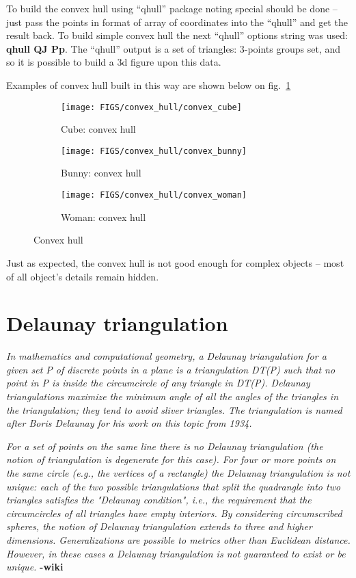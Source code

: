 \documentclass[11pt]{article}
\begin{document}
To build the convex hull using “qhull” package noting special should be done – just pass the points in format of array of coordinates into the “qhull” and get the result back. To build simple convex hull the next “qhull” options string was used: \textbf{qhull QJ Pp}. The “qhull” output is a set of triangles: 3-points groups set, and so it is possible to build a 3d figure upon this data.

Examples of convex hull built in this way are shown below on fig.~\ref{fig:convex}
\begin{figure}[h]
    \begin{subfigure}{.3\textwidth}
        \centering
        \texttt{[image: FIGS/convex\_hull/convex\_cube]}
        \caption{Cube: convex hull}
    \end{subfigure}
    \begin{subfigure}{.3\textwidth}
        \centering
        \texttt{[image: FIGS/convex\_hull/convex\_bunny]}
        \caption{Bunny: convex hull}
    \end{subfigure}
    \begin{subfigure}{.3\textwidth}
        \centering
        \texttt{[image: FIGS/convex\_hull/convex\_woman]}
        \caption{Woman: convex hull}
    \end{subfigure}
    \caption{Convex hull}
    \label{fig:convex}
\end{figure}

Just as expected, the convex hull is not good enough for complex objects – most of all object's details remain hidden.

\section{Delaunay triangulation}
\textit{In mathematics and computational geometry, a Delaunay triangulation for a given set P of discrete points in a plane is a triangulation DT(P) such that no point in P is inside the circumcircle of any triangle in DT(P). Delaunay triangulations maximize the minimum angle of all the angles of the triangles in the triangulation; they tend to avoid sliver triangles. The triangulation is named after Boris Delaunay for his work on this topic from 1934.}

\textit{For a set of points on the same line there is no Delaunay triangulation (the notion of triangulation is degenerate for this case). For four or more points on the same circle (e.g., the vertices of a rectangle) the Delaunay triangulation is not unique: each of the two possible triangulations that split the quadrangle into two triangles satisfies the "Delaunay condition", i.e., the requirement that the circumcircles of all triangles have empty interiors.
By considering circumscribed spheres, the notion of Delaunay triangulation extends to three and higher dimensions. Generalizations are possible to metrics other than Euclidean distance. However, in these cases a Delaunay triangulation is not guaranteed to exist or be unique.} \textbf{-wiki}
\end{document}
